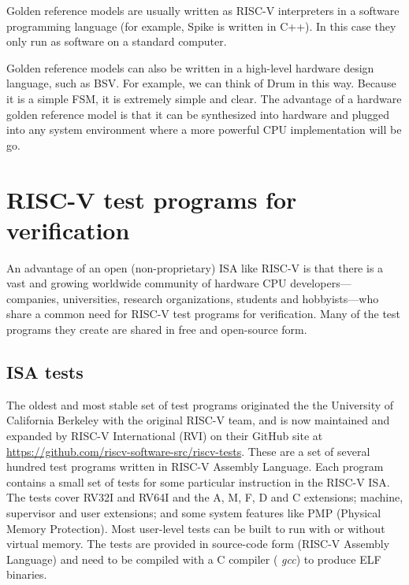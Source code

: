 Golden reference models are usually written as RISC-V interpreters in
a software programming language (for example, Spike is written in
C++).  In this case they only run as software on a standard computer.

Golden reference models can also be written in a high-level hardware
design language, such as BSV.  For example, we can think of Drum in
this way.  Because it is a simple FSM, it is extremely simple and
clear.  The advantage of a hardware golden reference model is that it
can be synthesized into hardware and plugged into any system
environment where a more powerful CPU implementation will be go.


\section{RISC-V test programs for verification}

\label{Sec_test_suites}

An advantage of an open (non-proprietary) ISA like RISC-V is that
there is a vast and growing worldwide community of hardware CPU
developers---companies, universities, research organizations, students
and hobbyists---who share a common need for RISC-V test programs for
verification.  Many of the test programs they create are shared in
free and open-source form.


\subsection{ISA tests}

The oldest and most stable set of test programs originated the the
University of California Berkeley with the original RISC-V team, and
is now maintained and expanded by RISC-V International (RVI) on their
GitHub site at
\url{https://github.com/riscv-software-src/riscv-tests}.  These are a
set of several hundred test programs written in RISC-V Assembly
Language.  Each program contains a small set of tests for some
particular instruction in the RISC-V ISA.  The tests cover RV32I and
RV64I and the A, M, F, D and C extensions; machine, supervisor and
user extensions; and some system features like PMP (Physical Memory
Protection).  Most user-level tests can be built to run with or
without virtual memory.  The tests are provided in source-code form
(RISC-V Assembly Language) and need to be compiled with a C compiler
({\eg} \emph{gcc}) to produce ELF binaries.

